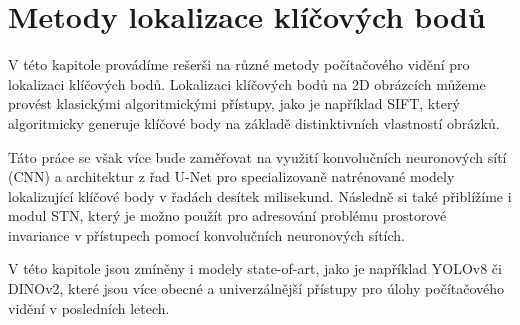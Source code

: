 \chapter{Metody lokalizace klíčových bodů}
\label{sec:Chapter2}
V této kapitole provádíme rešerši na různé metody počítačového vidění pro lokalizaci klíčových bodů. Lokalizaci klíčových bodů na 2D obrázcích můžeme provést klasickými algoritmickými přístupy, jako je například SIFT, který algoritmicky generuje klíčové body na základě distinktivních vlastností obrázků. 

Táto práce se však více bude zaměřovat na využití konvolučních neuronových sítí (CNN) a architektur z řad U-Net pro specializovaně natrénované modely lokalizující klíčové body v řadách desítek milisekund. Následně si také přiblížíme i modul STN, který je možno použít pro adresování problému prostorové invariance v přístupech pomocí konvolučních neuronových sítích.

V této kapitole jsou zmíněny i modely state-of-art, jako je například YOLOv8 či DINOv2, které jsou více obecné a univerzálnější přístupy pro úlohy počítačového vidění v posledních letech.
\endinput